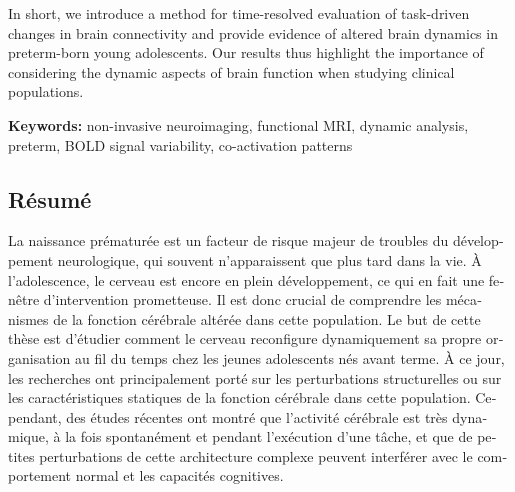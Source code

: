 \hspace{1cm} In short, we introduce a method for time-resolved evaluation of task-driven changes in brain connectivity and provide evidence of altered brain dynamics in preterm-born young adolescents. Our results thus highlight the importance of considering the dynamic aspects of brain function when studying clinical populations.

\vspace{0.5cm}

\textbf{Keywords:} non-invasive neuroimaging, functional MRI, dynamic analysis, preterm, BOLD signal variability, co-activation patterns



\begin{otherlanguage}{french}
\cleardoublepage
\chapter*{Résumé}

La naissance prématurée est un facteur de risque majeur de troubles du développement neurologique, qui souvent n'apparaissent que plus tard dans la vie. À l'adolescence, le cerveau est encore en plein développement, ce qui en fait une fenêtre d'intervention prometteuse. Il est donc crucial de comprendre les mécanismes de la fonction cérébrale altérée dans cette population. Le but de cette thèse est d'étudier comment le cerveau reconfigure dynamiquement sa propre organisation au fil du temps chez les jeunes adolescents nés avant terme. À ce jour, les recherches ont principalement porté sur les perturbations structurelles ou sur les caractéristiques statiques de la fonction cérébrale dans cette population. Cependant, des études récentes ont montré que l'activité cérébrale est très dynamique, à la fois spontanément et pendant l'exécution d'une tâche, et que de petites perturbations de cette architecture complexe peuvent interférer avec le comportement normal et les capacités cognitives.



\end{otherlanguage}
